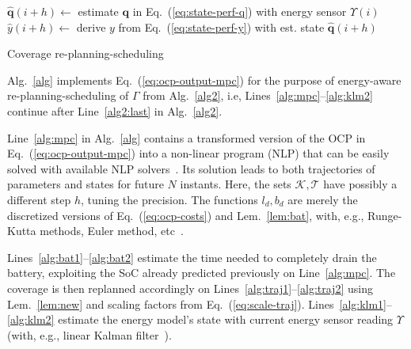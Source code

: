 \documentclass[letterpaper,10pt,journal,twoside]{IEEEtran}
\theoremstyle{definition}
\begin{document}
\begin{algorithm}[t]
\begin{algorithmic}[1]
      \vspace*{.8ex}
      \STATE $\hat{\mathbf{q}}(i+h)\gets${ estimate }$\mathbf{q}${ in Eq.~(\ref{eq:state-perf-q}) with energy sensor }$\Upsilon(i)$\vspace*{.3ex}\label{alg:klm1}
      \STATE $\hat{y}(i+h)\gets${ derive }$y${ from Eq.~(\ref{eq:state-perf-y}) with est. state }$\hat{\mathbf{q}}(i+h)$\vspace*{.3ex}\label{alg:klm2}
    \ENDFOR
  \end{algorithmic}
  \caption{Coverage re-planning-scheduling}\label{alg}
\end{algorithm}

Alg.~\ref{alg} implements Eq.~(\ref{eq:ocp-output-mpc}) for the purpose of energy-aware re-planning-scheduling of $\Gamma$ from Alg.~\ref{alg2}, i.e, Lines~\ref{alg:mpc}--\ref{alg:klm2} continue after Line~\ref{alg2:last} in Alg.~\ref{alg2}. 

Line~\ref{alg:mpc} in Alg.~\ref{alg} contains a transformed version of the OCP in Eq.~(\ref{eq:ocp-output-mpc}) into a non-linear program (NLP) that can be easily solved with available NLP solvers~\cite{rawlings2017model}. Its solution leads to both trajectories of parameters and states for future $N$ instants. Here, the sets $\mathcal{K},\mathcal{T}$ have possibly a different step $h$, tuning the precision. The functions $l_d,b_d$ are merely the discretized versions of Eq.~(\ref{eq:ocp-costs}) and Lem.~\ref{lem:bat}, with, e.g., Runge-Kutta methods, Euler method, etc~\cite{iserles2009first}.

Lines~\ref{alg:bat1}--\ref{alg:bat2} estimate the time needed to completely drain the battery, exploiting the SoC already predicted previously on Line~\ref{alg:mpc}. The coverage is then replanned accordingly on Lines~\ref{alg:traj1}--\ref{alg:traj2} using Lem.~\ref{lem:new} and scaling factors from Eq.~(\ref{eq:scale-traj}). Lines~\ref{alg:klm1}--\ref{alg:klm2} estimate the energy model's state with current energy sensor reading $\Upsilon$ (with, e.g., linear Kalman filter~\cite{kalman1960new}).


\end{document}
